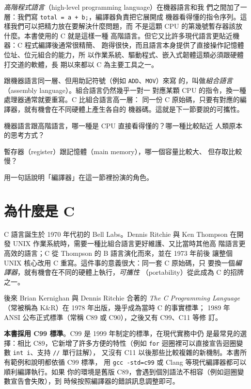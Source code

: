 \emph{高階程式語言}（high-level programming language）在機器語言和我
們之間加了一層：我們寫 \texttt{total = a + b;}，編譯器負責把它展開成
機器看得懂的指令序列。這樣我們可以把精力放在要解決什麼問題，而
不是這顆 CPU 的第幾號暫存器該放什麼。本書使用的 C 就是這樣一種
高階語言。但它又比許多現代語言更貼近機器：C 程式編譯後通常很精簡、
跑得很快，而且語言本身提供了直接操作記憶體位址、位元組合的能力，所
以作業系統、驅動程式、嵌入式韌體這類必須跟硬體打交道的軟體，長
期以來都以 C 為主要工具之一。


跟機器語言同一層、但用助記符號（例如 \texttt{ADD}、\texttt{MOV}）來寫
的，叫做\emph{組合語言}（assembly language）。組合語言仍然幾乎一對一
對應某顆 CPU 的指令，換一種處理器通常就要重寫。C 比組合語言高一層：
同一份 C 原始碼，只要有對應的編譯器，就有機會在不同硬體上產生各自的
機器碼。這就是下一節要說的可攜性。

\begin{drills}[label=drills:intro-what-is-programming]
\item 機器語言跟高階語言，哪一種是 CPU 直接看得懂的？哪一種比較貼近
人類原本的思考方式？
\item 暫存器（register）跟記憶體（main memory），哪一個容量比較大、
但存取比較慢？
\item 用一句話說明「編譯器」在這一節裡扮演的角色。
\end{drills}

\section{為什麼是 C}
\label{sec:intro-why-c}

C 語言誕生於 1970 年代初的 Bell Labs。Dennis Ritchie 與 Ken Thompson
在開發 UNIX 作業系統時，需要一種比組合語言更好維護、又比當時其他高
階語言更高效的語言；C 從 Thompson 的 B 語言演化而來，並在 1973 年前後
讓整個 UNIX 核心改用 C 重寫。這件事的意義很大：同一套 C 原始碼，只
要換一個\emph{編譯器}，就有機會在不同的硬體上執行，\emph{可攜性}
（portability）從此成為 C 的招牌之一。

後來 Brian Kernighan 與 Dennis Ritchie 合著的 \emph{The C Programming
Language}（常被稱為 K\&R）在 1978 年出版，幾乎成為當時 C 的事實標準；
1989 年 ANSI 公布正式標準（常稱 C89 或 C90），之後又有 C99、C11 等修
訂。

\textbf{本書採用 C99 標準}。C99 是 1999 年制定的標準，在現代實務中仍
是最常見的選擇：相比 C89，它新增了許多方便的特性（例如 \texttt{for}
迴圈裡可以直接宣告迴圈變數 \texttt{int i}、支持 \texttt{//} 單行註解），
又沒有 C11 以後那些比較複雜的新機制。本書所有範例和說明都依循 C99 標準，
用 \texttt{gcc -std=c99} 或 Clang 等現代編譯器都可以順利編譯執行。如果
你的環境是舊版 C89，會遇到個別語法不相容（例如迴圈變數宣告會失敗），到
時候按照編譯器的錯誤訊息調整即可。

